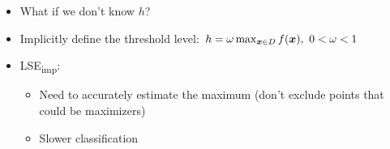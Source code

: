 \documentclass[10pt,mathserif,serif,handout]{beamer}
\newcommand{\iacl}{\textsf{LSE\textsubscript{imp}}\xspace}
\begin{document}
\begin{frame}
\begin{itemize}
\item<1-> What if we don't know $h$?
\item<2-> Implicitly define the threshold level: $h = \omega \max_{\bm{x}\in D} f(\bm{x}),\ 0 < \omega < 1$
\item<5-> \iacl:
\begin{itemize}
\item<5-> Need to accurately estimate the maximum (don't exclude points that could be maximizers)
\item<6-> Slower classification
\end{itemize}
\end{itemize}
\begin{center}
\color{white}
\color{black}
\end{center}
\end{frame}
\end{document}
